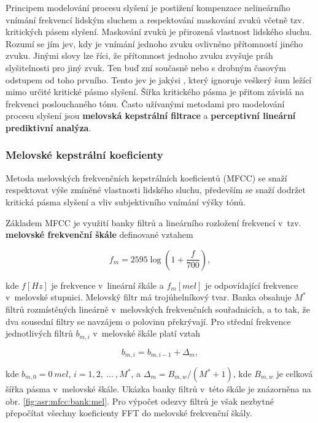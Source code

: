 Principem modelování procesu slyšení je postižení kompenzace nelineárního vnímání frekvencí lidským sluchem a respektování maskování zvuků včetně tzv. kritických pásem slyšení. Maskování zvuků je přirozená vlastnost lidského sluchu. Rozumí se jím jev, kdy je vnímání jednoho zvuku ovlivněno přítomností jiného zvuku. Jinými slovy lze říci, že přítomnost jednoho zvuku zvyšuje práh slyšitelnosti pro jiný zvuk. Ten buď zní současně nebo s drobným časovým odstupem od toho prvního. Tento jev je jakýsi , který ignoruje veškerý šum ležící mimo určité kritické pásmo slyšení. Šířka kritického pásma je přitom závislá na frekvenci poslouchaného tónu. Často užívanými metodami pro modelování procesu slyšení jsou \textbf{melovská kepstrální filtrace} a \textbf{perceptivní lineární prediktivní analýza}.

\subsubsection{Melovské kepstrální koeficienty}

Metoda melovských frekvenčních kepstrálních koeficientů (MFCC) se snaží respektovat výše zmíněné vlastnosti lidského sluchu, především se snaží dodržet kritická pásma slyšení a vliv subjektivního vnímání výšky tónů.

Základem MFCC je využití banky filtrů a lineárního rozložení frekvencí v~tzv. \textbf{melovské frekvenční škále} definované vztahem

\begin{equation}
  f_m = 2595 \log \left(1 + \frac{f}{700}\right),
  \label{eq:asr:mfcc:melscale}
\end{equation}

\noindent kde $f \left[Hz\right]$ je frekvence v~lineární škále a $f_m \left[mel\right]$ je odpovídající frekvence v~melovské stupnici. Melovský filtr má trojúhelníkový tvar. Banka obsahuje $M^{*}$ filtrů rozmístěných lineárně v~melovských frekvenčních souřadnicích, a to tak, že dva sousední filtry se navzájem o polovinu překrývají. Pro střední frekvence jednotlivých filtrů $b_{m,i}$ v~melovské škále platí vztah

\begin{equation}
  b_{m,i} = b_{m,i-1} + \Delta_{m},
  \label{eq:asr:mfcc:freq}
\end{equation}

\noindent kde $b_{m, 0} = 0\ mel$, $i = 1, 2,\ \dots\ , M^{*}$, a $\Delta_m = B_{m,w} / (M^{*} + 1)$, kde $B_{m,w}$ je celková šířka pásma v~melovské škále. Ukázka banky filtrů v~této škále je znázorněna na obr. \ref{fig:asr:mfcc:bank:mel}. Pro výpočet odezvy filtrů je však nezbytné přepočítat všechny koeficienty FFT do melovské frekvenční škály.

